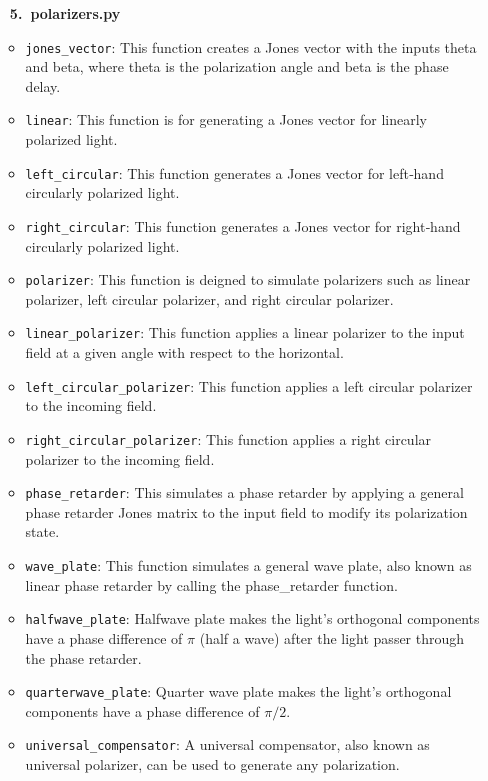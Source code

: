\documentclass[a4paper,12pt]{report}
\begin{document}
\begin{itemize}[itemsep=1em,leftmargin=*]
  \item[\large\bfseries 5.\ polarizers.py]
    \begin{itemize}[itemsep=0.5em]
      \item \texttt{jones\_vector}: This function creates a Jones vector with the inputs theta and beta, where theta is the polarization angle and beta is the phase delay.
      \item \texttt{linear}: This function is for generating a Jones vector for linearly polarized light.
      \item \texttt{left\_circular}: This function generates a Jones vector for left‐hand circularly polarized light.
      \item \texttt{right\_circular}: This function generates a Jones vector for right‐hand circularly polarized light.
      \item \texttt{polarizer}: This function is deigned to simulate polarizers such as linear polarizer, left circular polarizer, and right circular polarizer.
      \item \texttt{linear\_polarizer}: This function applies a linear polarizer to the input field at a given angle with respect to the horizontal.
      \item \texttt{left\_circular\_polarizer}: This function applies a left circular polarizer to the incoming field.
      \item \texttt{right\_circular\_polarizer}: This function applies a right circular polarizer to the incoming field.
      \item \texttt{phase\_retarder}: This simulates a phase retarder by applying a general phase retarder Jones matrix to the input field to modify its polarization state.
      \item \texttt{wave\_plate}: This function simulates a general wave plate, also known as linear phase retarder by calling the phase\_retarder function.
      \item \texttt{halfwave\_plate}: Halfwave plate makes the light's orthogonal components have a phase difference of $\pi$ (half a wave) after the light passer through the phase retarder.
      \item \texttt{quarterwave\_plate}: Quarter wave plate makes the light's orthogonal components have a phase difference of $\pi/2$.
      \item \texttt{universal\_compensator}: A universal compensator, also known as universal polarizer, can be used to generate any polarization.
    \end{itemize}


\end{itemize}
\end{document}
